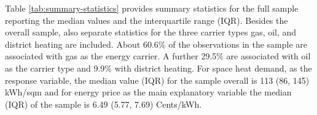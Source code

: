 \documentclass[12pt,twoside]{reedthesis}
\begin{document}
Table \ref{tab:summary-statistics} provides summary statistics for the full sample reporting the median values and the interquartile range (IQR). Besides the overall sample, also separate statistics for the three carrier types gas, oil, and district heating are included. About 60.6\% of the observations in the sample are associated with gas as the energy carrier. A further 29.5\% are associated with oil as the carrier type and 9.9\% with district heating. For space heat demand, as the response variable, the median value (IQR) for the sample overall is 113 (86, 145) kWh/sqm and for energy price as the main explanatory variable the median (IQR) of the sample is 6.49 (5.77, 7.69) Cents/kWh.
\begin{table}[]
\centering
\caption{Summary statistics}
\label{tab:summary-statistics}
\end{table}
\end{document}
